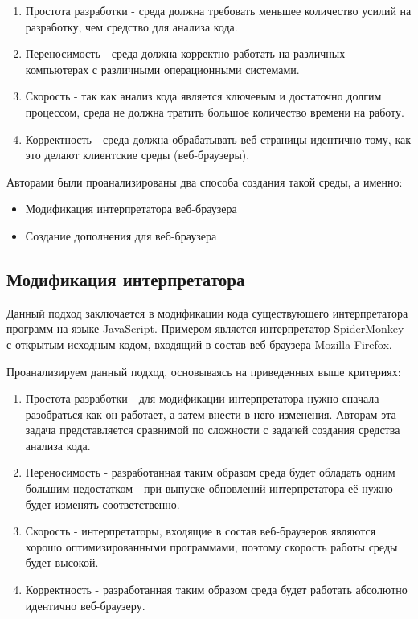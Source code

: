 	\begin{enumerate}
		\item Простота разработки - среда должна требовать меньшее количество усилий на разработку, чем средство для анализа кода.
		\item Переносимость - среда должна корректно работать на различных компьютерах с различными операционными системами.
		\item Скорость - так как анализ кода является ключевым и достаточно долгим процессом, среда не должна тратить большое количество времени на работу.
		\item Корректность - среда должна обрабатывать веб-страницы идентично тому, как это делают клиентские среды (веб-браузеры).
	\end{enumerate}
	\bigskip

	Авторами были проанализированы два способа создания такой среды, а именно:
	\begin{itemize}
		\item Модификация интерпретатора веб-браузера
		\item Создание дополнения для веб-браузера
	\end{itemize}

\subsection{Модификация интерпретатора}
	Данный подход заключается в модификации кода существующего интерпретатора программ на языке JavaScript. Примером является интерпретатор SpiderMonkey с открытым исходным кодом, входящий в состав веб-браузера Mozilla Firefox. 

	Проанализируем данный подход, основываясь на приведенных выше критериях:
	\begin{enumerate}
		\item Простота разработки - для модификации интерпретатора нужно сначала разобраться как он работает, а затем внести в него изменения. Авторам эта задача представляется сравнимой по сложности с задачей создания средства анализа кода.
		\item Переносимость - разработанная таким образом среда будет обладать одним большим недостатком - при выпуске обновлений интерпретатора её нужно будет изменять соответственно.
		\item Скорость - интерпретаторы, входящие в состав веб-браузеров являются хорошо оптимизированными программами, поэтому скорость работы среды будет высокой.
		\item Корректность - разработанная таким образом среда будет работать абсолютно идентично веб-браузеру.
	\end{enumerate}


